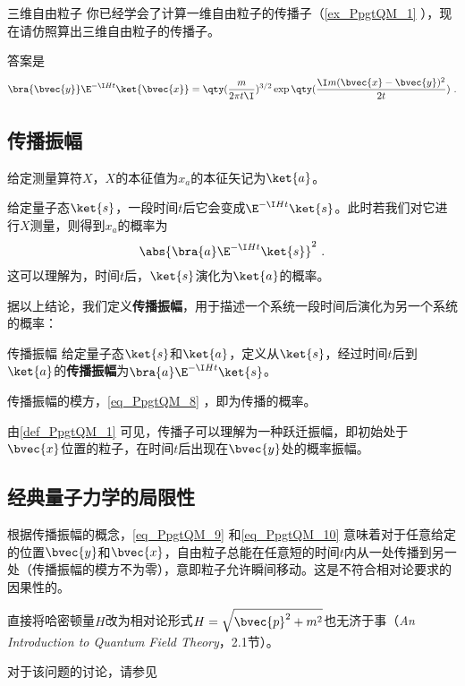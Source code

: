 \begin{exercise}{三维自由粒子}
你已经学会了计算一维自由粒子的传播子（\autoref{ex_PpgtQM_1} ），现在请仿照算出三维自由粒子的传播子。

答案是
\begin{equation}\label{eq_PpgtQM_10}
\bra{\bvec{y}}\E^{-\I H t}\ket{\bvec{x}} = \qty(\frac{m}{2\pi t\I})^{3/2}\exp\qty(\frac{\I m(\bvec{x}-\bvec{y})^2}{2t})~.
\end{equation}
\end{exercise}









\subsection{传播振幅}


给定测量算符$X$，$X$的本征值为$x_a$的本征矢记为$\ket{a}$。

给定量子态$\ket{s}$，一段时间$t$后它会变成$\E^{-\I Ht}\ket{s}$。此时若我们对它进行$X$测量，则得到$x_a$的概率为
\begin{equation}\label{eq_PpgtQM_8}
\abs{\bra{a}\E^{-\I Ht}\ket{s}}^2~.
\end{equation}
这可以理解为，时间$t$后，$\ket{s}$演化为$\ket{a}$的概率。

据以上结论，我们定义\textbf{传播振幅}，用于描述一个系统一段时间后演化为另一个系统的概率：

\begin{definition}{传播振幅}\label{def_PpgtQM_1}
给定量子态$\ket{s}$和$\ket{a}$，定义从$\ket{s}$，经过时间$t$后到$\ket{a}$的\textbf{传播振幅}为$\bra{a}\E^{-\I Ht}\ket{s}$。

传播振幅的模方，\autoref{eq_PpgtQM_8} ，即为传播的概率。
\end{definition}

由\autoref{def_PpgtQM_1} 可见，传播子可以理解为一种跃迁振幅，即初始处于$\bvec{x}$位置的粒子，在时间$t$后出现在$\bvec{y}$处的概率振幅。




\subsection{经典量子力学的局限性}

根据传播振幅的概念，\autoref{eq_PpgtQM_9} 和\autoref{eq_PpgtQM_10} 意味着对于任意给定的位置$\bvec{y}$和$\bvec{x}$，自由粒子总能在任意短的时间$t$内从一处传播到另一处（传播振幅的模方不为零），意即粒子允许瞬间移动。这是不符合相对论要求的因果性的。

直接将哈密顿量$H$改为相对论形式$H=\sqrt{\bvec{p}^2+m^2}$也无济于事（\textsl{An Introduction to Quantum Field Theory}\cite{Peskin}，2.1节）。

对于该问题的讨论，请参见














